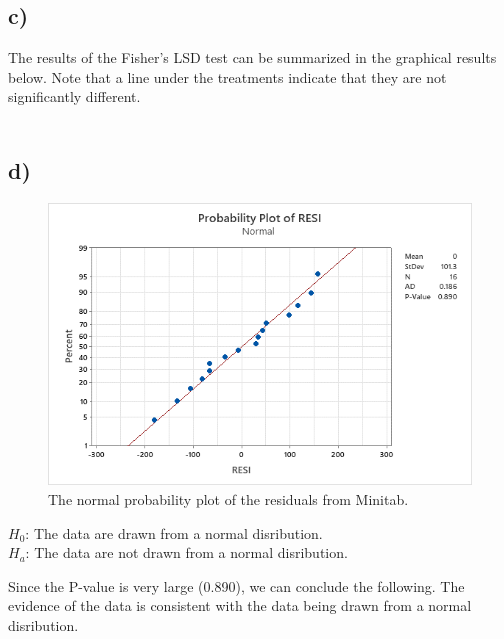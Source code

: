 \documentclass{article}
\begin{document}
\subsection*{c)}
The results of the Fisher's LSD test can be summarized in the graphical results below.
Note that a line under the treatments indicate that they are not significantly different. \\
\vspace{12pt}
\\


\subsection*{d)}

\begin{figure}[h]
    \centering
    \includegraphics[width=1\textwidth]{./images/2_d.png}
    \caption{The normal probability plot of the residuals from Minitab.}
    \label{fig:2_d}
\end{figure}
\begin{flushleft}
$H_0$: The data are drawn from a normal disribution. \\
$H_a$: The data are not drawn from a normal disribution. \\
\end{flushleft}
Since the P-value is very large (0.890), we can conclude the following. 
The evidence of the data is consistent with the data being drawn from a normal disribution.
\end{document}

